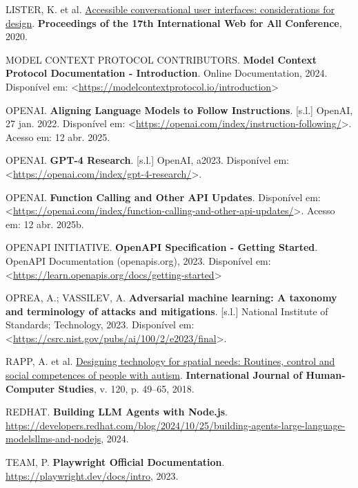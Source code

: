 \documentclass[
]{article}
\newlength{\cslhangindent}
\newenvironment{CSLReferences}[2] %
 {\begin{list}{}{%
  \setlength{\itemindent}{0pt}
  \setlength{\leftmargin}{0pt}
  \setlength{\parsep}{0pt}
  \ifodd #1
   \setlength{\leftmargin}{\cslhangindent}
   \setlength{\itemindent}{-1\cslhangindent}
  \fi
  \setlength{\itemsep}{#2\baselineskip}}}
 {\end{list}}
\begin{document}
\begin{CSLReferences}{0}{1}
LISTER, K. et al.
\href{https://api.semanticscholar.org/CorpusID:218539971}{Accessible
conversational user interfaces: considerations for design}.
\textbf{Proceedings of the 17th International Web for All Conference},
2020.

MODEL CONTEXT PROTOCOL CONTRIBUTORS. \textbf{{Model Context Protocol
Documentation - Introduction}}. Online Documentation, 2024. Disponível
em:
\textless{}\url{https://modelcontextprotocol.io/introduction}\textgreater{}

OPENAI. \textbf{Aligning Language Models to Follow Instructions}.
{[}s.l.{]} OpenAI, 27 jan. 2022. Disponível em:
\textless{}\url{https://openai.com/index/instruction-following/}\textgreater.
Acesso em: 12 abr. 2025.

OPENAI. \textbf{GPT-4 Research}. {[}s.l.{]} OpenAI, a2023. Disponível
em:
\textless{}\url{https://openai.com/index/gpt-4-research/}\textgreater.

OPENAI. \textbf{Function Calling and Other API Updates}. Disponível em:
\textless{}\url{https://openai.com/index/function-calling-and-other-api-updates/}\textgreater.
Acesso em: 12 abr. 2025b.

OPENAPI INITIATIVE. \textbf{{OpenAPI Specification - Getting Started}}.
OpenAPI Documentation (openapis.org), 2023. Disponível em:
\textless{}\url{https://learn.openapis.org/docs/getting-started}\textgreater{}

OPREA, A.; VASSILEV, A. \textbf{Adversarial machine learning: A taxonomy
and terminology of attacks and mitigations}. {[}s.l.{]} National
Institute of Standards; Technology, 2023. Disponível em:
\textless{}\url{https://csrc.nist.gov/pubs/ai/100/2/e2023/final}\textgreater.

RAPP, A. et al.
\href{https://doi.org/10.1016/j.ijhcs.2018.07.005}{Designing technology
for spatial needs: Routines, control and social competences of people
with autism}. \textbf{International Journal of Human-Computer Studies},
v. 120, p. 49--65, 2018.

REDHAT. \textbf{Building LLM Agents with Node.js}.
\url{https://developers.redhat.com/blog/2024/10/25/building-agents-large-language-modelsllms-and-nodejs},
2024.

TEAM, P. \textbf{Playwright Official Documentation}.
\url{https://playwright.dev/docs/intro}, 2023.

\end{CSLReferences}
\end{document}

